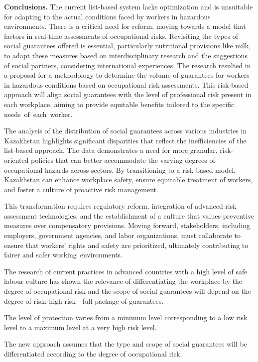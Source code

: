\begin{multicols}{2}
{\bfseries Conclusions.} The current list-based system lacks optimization
and is unsuitable for adapting to the actual conditions faced by workers
in hazardous environments. There is a critical need for reform, moving
towards a model that factors in real-time assessments of occupational
risks. Revisiting the types of social guarantees offered is essential,
particularly nutritional provisions like milk, to adapt these measures
based on interdisciplinary research and the suggestions of social
partners, considering international experiences. The research resulted
in a proposal for a methodology to determine the volume of guarantees
for workers in hazardous conditions based on occupational risk
assessments. This risk-based approach will align social guarantees with
the level of professional risk present in each workplace, aiming to
provide equitable benefits tailored to the specific
needs~of~each~worker.

The analysis of the distribution of social guarantees across various
industries in Kazakhstan highlights significant disparities that reflect
the inefficiencies of the list-based approach. The data demonstrates a
need for more granular, risk-oriented policies that can better
accommodate the varying degrees of occupational hazards across sectors.
By transitioning to a risk-based model, Kazakhstan can enhance workplace
safety, ensure equitable treatment of workers, and foster a culture of
proactive risk management.

This transformation requires regulatory reform, integration of advanced
risk assessment technologies, and the establishment of a culture that
values preventive measures over compensatory provisions. Moving forward,
stakeholders, including employers, government agencies, and labor
organizations, must collaborate to ensure that workers'{}
rights and safety are prioritized, ultimately contributing to fairer and
safer working~environments.

The research of current practices in advanced countries with a high
level of safe labour culture has shown the relevance of differentiating
the workplace by the degree of occupational risk and the scope of social
guarantees will depend on the degree of risk: high risk - full package
of guarantees.

The level of protection varies from a minimum level corresponding to a
low risk level to a maximum level at a very high risk level.

The new approach assumes that the type and scope of social guarantees
will be differentiated according to the degree of occupational risk.


\end{multicols}
